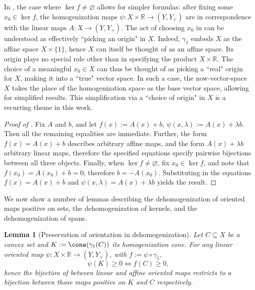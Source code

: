 \documentclass{article}
\theoremstyle{plain}
\newtheorem{lemma}[lemma]{Lemma}
\theoremstyle{definition}
\theoremstyle{remark}
\begin{document}
In ,
the case where $\ker f \neq \varnothing$ allows for simpler formulas: after fixing some $x_0 \in \ker f$,
the homogenization maps $\psi:X  \times \mathbb{R} \to (Y,Y_+)$ are in correspondence with the linear maps $A:X \to (Y,Y_+)$.
The act of choosing $x_0$ in  can be understood as effectively ``picking an origin" in $X$.
Indeed, $\gamma_1$ embeds $X$ as the affine space $X  \times \{ 1 \}$, hence $X$ can itself be thought of as an affine space. Its origin plays no special role other than in specifying the product $X  \times \mathbb{R}$. The choice of a meaningful $x_0  \in X$ can thus be thought of as picking a ``real" origin for $X$, making it into a ``true" vector space.
In such a case, the now-vector-space $X$ takes the place of the homogenization space as the base vector space, allowing for simplified results.
This simplification via a ``choice of origin" in $X$ is a recurring theme in this work.
\begin{proof}[\hypertarget{loc:oriented_linear_maps_are_in_bijection_with_oriented_affine_maps.proof}{}Proof of ]

Fix $A$ and $b$, and let $f(x) := A(x)+b$, $\psi(x,\lambda) := A(x) + \lambda b$.
Then all the remaining equalities are immediate.
Further, the form $f(x) = A(x)+ b$ describes arbitrary affine maps,
and the form $A(x)+ \lambda b$ arbitrary linear maps, therefore the specified
equations specify pairwise bijections between all three objects.
Finally, when $\ker f \neq \varnothing$, 
fix $x_0 \in \ker f$, and note that
$f(x_0) = A(x_0)+b = 0$,
therefore $b = -A(x_0)$. Substituting in the equations
$f(x)= A(x)+ b$ and $\psi(x, \lambda)= A(x) + \lambda b$ yields the result.
\end{proof}
We now show a number of lemmas describing the dehomogenization of oriented maps positive on sets, the dehomogenization of kernels, and the dehomogenization
of spans.
\begin{lemma}[Preservation of orientation in dehomogenization]
\label{loc:preservation_of_orientation_in_dehomogenization.statement}
Let $C \subseteq X$ be a convex set and $K := \cone(\gamma_1(C))$ its homogenization cone. For any linear oriented map $\psi:X \times \mathbb{R} \to(Y,Y_+)$, with $f:= \psi \circ \gamma_1$,
\begin{equation*}
\psi(K) \geq 0  \iff f(C) \geq 0,
\end{equation*}
hence the bijection of  between linear and affine oriented maps
restricts to a bijection between those maps positive on $K$ and $C$ respectively.
\end{lemma}
\end{document}
